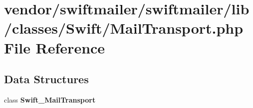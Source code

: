\section{vendor/swiftmailer/swiftmailer/lib/classes/\+Swift/\+Mail\+Transport.php File Reference}
\label{_mail_transport_8php}
\subsection*{Data Structures}
\begin{DoxyCompactItemize}
\item 
class {\bf Swift\+\_\+\+Mail\+Transport}
\end{DoxyCompactItemize}
